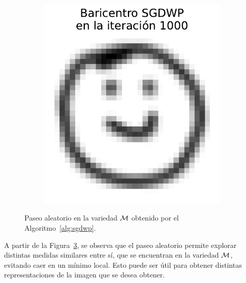 \begin{figure}[H]
\begin{subfigure}[b]{0.17\textwidth}
        \label{fig:bar-SGDWP-random-walk-iter-09}
    \end{subfigure}
    \hfill
    \begin{subfigure}[b]{0.17\textwidth}
        \centering
        \includegraphics[width=\textwidth]{img/sgdwp-rw/bar-SGDWP-random-walk-iter-10.pdf}
        \label{fig:bar-SGDWP-random-walk-iter-10}
    \end{subfigure}
    \caption{Paseo aleatorio en la variedad $\operatorname{\mathcal{M}}$ obtenido por el Algoritmo~\ref{alg:sgdwp}.}
    \label{fig:bar-SGDWP-random-walk}
\end{figure}

A partir de la Figura~\ref{fig:bar-SGDWP-random-walk}, se observa que el paseo aleatorio permite explorar distintas medidas similares entre sí, que se encuentran en la variedad $\operatorname{\mathcal{M}}$, evitando caer en un mínimo local. Esto puede ser útil para obtener distintas representaciones de la imagen que se desea obtener.

